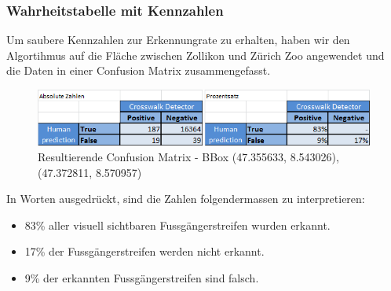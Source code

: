\subsubsection{Wahrheitstabelle mit Kennzahlen}
Um saubere Kennzahlen zur Erkennungrate zu erhalten, haben wir den Algortihmus auf die Fläche zwischen Zollikon und Zürich Zoo angewendet und die Daten in einer Confusion Matrix zusammengefasst.
\\
\begin{figure}[H]
	\centering
	\includegraphics[]{images/Confusionmatrix_dl_end.png}
	\caption[Resultierende Confusion Matrix]{Resultierende Confusion Matrix - BBox (47.355633, 8.543026), (47.372811, 8.570957)}
\end{figure}
\newpage
In Worten ausgedrückt, sind die Zahlen folgendermassen zu interpretieren:
\begin{itemize}
	\item 83\% aller visuell sichtbaren Fussgängerstreifen wurden erkannt.
	\item 17\% der Fussgängerstreifen werden nicht erkannt.
	\item 9\% der erkannten Fussgängerstreifen sind falsch.
\end{itemize}
			


